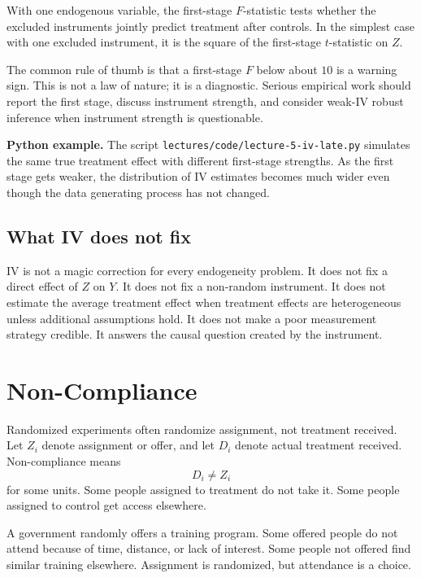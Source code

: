 \begin{defN}
With one endogenous variable, the first-stage $F$-statistic tests whether the
excluded instruments jointly predict treatment after controls. In the simplest
case with one excluded instrument, it is the square of the first-stage
$t$-statistic on $Z$.
\end{defN}

The common rule of thumb is that a first-stage $F$ below about $10$ is a warning
sign. This is not a law of nature; it is a diagnostic. Serious empirical work
should report the first stage, discuss instrument strength, and consider
weak-IV robust inference when instrument strength is questionable.

\begin{boxD}
\textbf{Python example.} The script
\texttt{lectures/code/lecture-5-iv-late.py} simulates the same true treatment
effect with different first-stage strengths. As the first stage gets weaker,
the distribution of IV estimates becomes much wider even though the data
generating process has not changed.
\end{boxD}

\subsection{What IV does not fix}

IV is not a magic correction for every endogeneity problem. It does not fix a
direct effect of $Z$ on $Y$. It does not fix a non-random instrument. It does
not estimate the average treatment effect when treatment effects are
heterogeneous unless additional assumptions hold. It does not make a poor
measurement strategy credible. It answers the causal question created by the
instrument.

\section{Non-Compliance}

Randomized experiments often randomize assignment, not treatment received. Let
$Z_i$ denote assignment or offer, and let $D_i$ denote actual treatment
received. Non-compliance means
\[
    D_i \neq Z_i
\]
for some units. Some people assigned to treatment do not take it. Some people
assigned to control get access elsewhere.

\begin{exmp}
A government randomly offers a training program. Some offered people do not
attend because of time, distance, or lack of interest. Some people not offered
find similar training elsewhere. Assignment is randomized, but attendance is a
choice.
\end{exmp}

